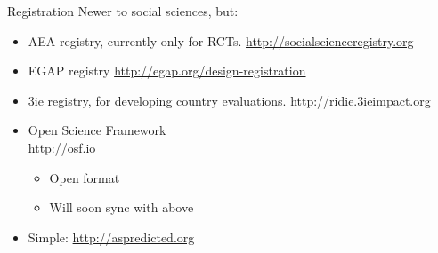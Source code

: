 \documentclass{beamer}
\begin{document}
\begin{frame}{Registration}
 Newer to social sciences, but:
   \begin{itemize}[<.->]
   \item
   	AEA registry, currently only for RCTs. \url{http://socialscienceregistry.org}
   \item
    EGAP registry \url{http://egap.org/design-registration}
   \item 
    3ie registry, for developing country evaluations. \url{http://ridie.3ieimpact.org}
   \item
   	Open Science Framework\\ \url{http://osf.io}
   	\begin{itemize}
   	\item
   	Open format
   	\item
   	Will soon sync with above
   	\end{itemize}
   	\item Simple: \url{http://aspredicted.org}
   \end{itemize}
 
\end{frame}

 { %
    \begin{frame}[plain, label=AEAreg]
     \end{frame}
}
\end{document}
